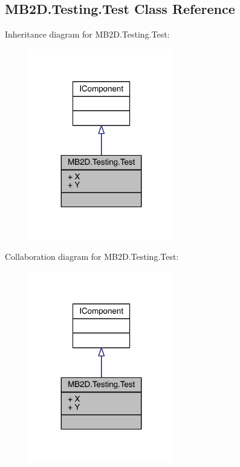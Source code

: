 \hypertarget{class_m_b2_d_1_1_testing_1_1_test}{}\subsection{M\+B2\+D.\+Testing.\+Test Class Reference}
\label{class_m_b2_d_1_1_testing_1_1_test}


Inheritance diagram for M\+B2\+D.\+Testing.\+Test\+:
\nopagebreak
\begin{figure}[H]
\begin{center}
\leavevmode
\includegraphics[width=179pt]{class_m_b2_d_1_1_testing_1_1_test__inherit__graph}
\end{center}
\end{figure}


Collaboration diagram for M\+B2\+D.\+Testing.\+Test\+:
\nopagebreak
\begin{figure}[H]
\begin{center}
\leavevmode
\includegraphics[width=179pt]{class_m_b2_d_1_1_testing_1_1_test__coll__graph}
\end{center}
\end{figure}
